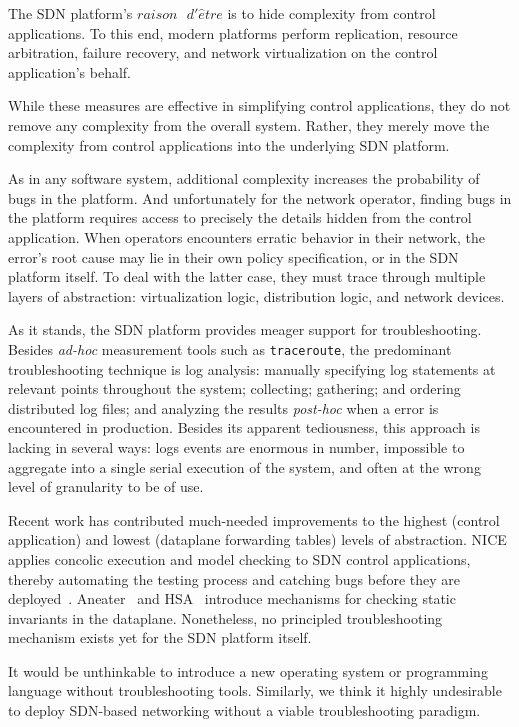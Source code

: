 The SDN platform's $raison\text{ }d'\hat{e}tre$ is to 
hide complexity from control applications. To this end, modern platforms perform
replication, resource arbitration, failure recovery, and network 
virtualization on the control application's behalf. 

While these measures are effective in simplifying control applications,
they do not remove any complexity from the overall system. Rather, they merely move the complexity
from control applications into the underlying SDN platform.

As in any software system, additional complexity increases the probability of
bugs in the platform. And unfortunately for the network operator, finding bugs in the platform requires
access to precisely the details hidden from the control application.
When operators encounters erratic behavior in their network, the error's root
cause may lie in their own policy specification, or in the SDN platform
itself. To deal with the latter case, they must trace through
multiple layers of abstraction: virtualization logic, distribution logic, and
network devices.

As it stands, the SDN platform provides meager support for troubleshooting.
Besides {\it ad-hoc} measurement tools
such as {\tt traceroute}, the predominant troubleshooting technique is
log analysis: manually specifying log statements at relevant points throughout the system;
collecting; gathering; and ordering distributed log files; and analyzing the
results {\it post-hoc} when a error is encountered in production. Besides its
apparent tediousness, this approach is lacking in several ways: logs events
are enormous in number, impossible to aggregate into a single serial
execution of the system, and often at the wrong level of granularity to be of
use.

Recent work has contributed much-needed improvements to the highest (control
application) and lowest (dataplane forwarding tables) levels of abstraction. 
NICE applies concolic execution and model checking to SDN control
applications, thereby automating the testing process and catching bugs before
they are deployed~\cite{nice}. Aneater~\cite{anteater} and HSA~\cite{hsa}
introduce mechanisms for checking static invariants in the dataplane.
Nonetheless, no principled troubleshooting mechanism exists yet for the SDN
platform itself.

It would be unthinkable to introduce a new operating system or programming
language without troubleshooting tools. Similarly, we think it highly undesirable to deploy SDN-based
networking without a viable troubleshooting paradigm. 

